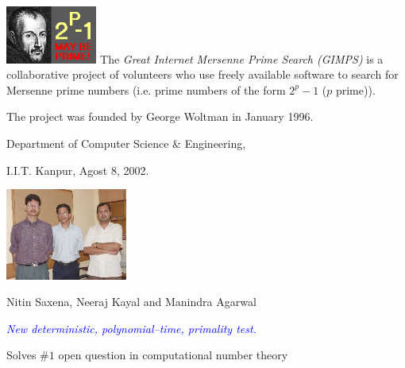 \documentclass[landscape,handout]{powersem} %
\newcommand{\heading}[1]{%
 \begin{center}
  \large\bf
  \shadowbox{{\textcolor{conceptcolor}{#1}}}%
 \end{center}
 \vspace{1ex minus 1ex}}
\begin{document}
\begin{slide}
\begin{itemize}
\end{itemize}

\end{slide}


\begin{slide}
\heading{Great Internet Mersenne Prime Search (GIMPS)}\pause

\includegraphics[width=3cm]{images/GIMPS_logo.png}
The \emph{Great Internet Mersenne Prime Search (GIMPS)} 
is a collaborative project of volunteers who use freely available software to search for Mersenne prime numbers
(i.e. prime numbers of the form $2^p-1$ ($p$ prime)). \pause

The project was founded by George Woltman in January 1996.


\end{slide}

\begin{slide}
\heading{The AKS deterministic primality test}\pause

\centerline{Department of Computer Science \& Engineering,}
\centerline{I.I.T. Kanpur, Agost 8, 2002.}\pause

\centerline{\includegraphics[width=4cm]{images/primality-group.jpg}}

\centerline{Nitin Saxena, Neeraj Kayal and Manindra Agarwal}\pause

\centerline{\textcolor{blue}{\emph{New deterministic,
polynomial--time, primality test.}}}\pause

Solves $\# 1$ open question in computational number theory\pause


\heading{http://www.cse.iitk.ac.in/news/primality.html}
\end{slide}
\end{document}
